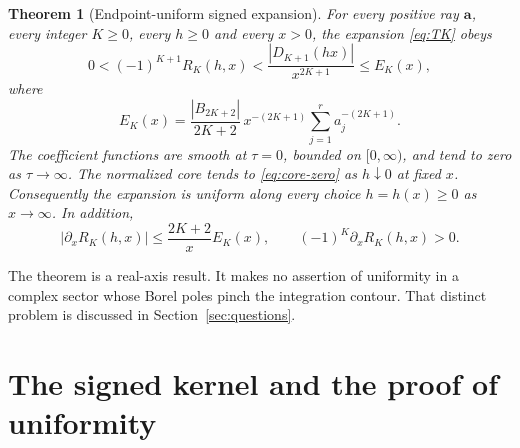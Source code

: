 \documentclass[11pt,a4paper]{article}
\numberwithin{equation}{section}
\newtheorem{theorem}{Theorem}[section]
\theoremstyle{definition}\newtheorem{definition}[theorem]{Definition}
\theoremstyle{remark}\newtheorem{remark}[theorem]{Remark}
\newcommand{\avec}{\boldsymbol a}
\begin{document}
\begin{theorem}[Endpoint-uniform signed expansion]
\label{thm:uniform}
For every positive ray $\avec$, every integer $K\ge0$, every $h\ge0$ and every
$x>0$, the expansion \eqref{eq:TK} obeys
\begin{equation}
 0<(-1)^{K+1}R_K(h,x)
   <\frac{|D_{K+1}(hx)|}{x^{2K+1}}
   \le E_K(x),
 \label{eq:main-bound}
\end{equation}
where
\begin{equation}
 E_K(x)=\frac{|B_{2K+2}|}{2K+2}\,
           x^{-(2K+1)}\sum_{j=1}^r a_j^{-(2K+1)}.
 \label{eq:EK}
\end{equation}
The coefficient functions are smooth at $\tau=0$, bounded on $[0,\infty)$,
and tend to zero as $\tau\to\infty$. The normalized core tends to
\eqref{eq:core-zero} as $h\downarrow0$ at fixed $x$.
Consequently the expansion is uniform along every choice $h=h(x)\ge0$ as
$x\to\infty$. In addition,
\begin{equation}
 |\partial_xR_K(h,x)|\le\frac{2K+2}{x}E_K(x),\qquad
 (-1)^K\partial_xR_K(h,x)>0.
 \label{eq:derivative-error}
\end{equation}
\end{theorem}

The theorem is a real-axis result. It makes no assertion of uniformity in a
complex sector whose Borel poles pinch the integration contour. That distinct
problem is discussed in Section~\ref{sec:questions}.

\section{The signed kernel and the proof of uniformity}
\label{sec:proof-uniform}
\end{document}
